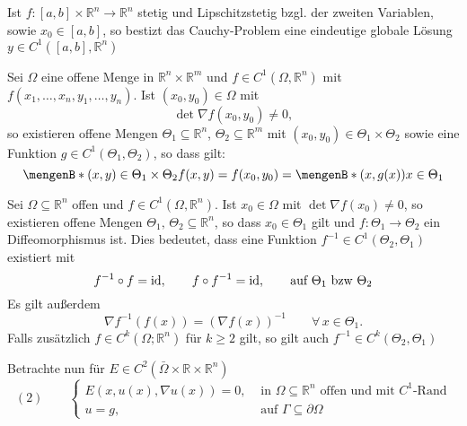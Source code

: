 \begin{bemerkung}
	Ist $f: [a,b] \times \mathbb{R}^n \to \mathbb{R}^n$ stetig und Lipschitzstetig bzgl. der zweiten Variablen, sowie $x_0 \in [a,b]$, so bestizt das Cauchy-Problem
	eine eindeutige globale Lösung $y \in C^1([a,b], \mathbb{R}^n)$
\end{bemerkung}

\begin{satz}
	Sei $\Omega$ eine offene Menge in $\mathbb{R}^n \times \mathbb{R}^m$ und $f \in C^1(\Omega, \mathbb{R}^n)$ mit $f(x_1,\dots,x_n,y_1, \dots, y_n)$. Ist $(x_0,y_0) \in \Omega$ mit 
	\[
		\det  \nabla f(x_0,y_0) \neq 0,
	\] 
	so existieren offene Mengen $\Theta_1 \subseteq \mathbb{R}^n $, $ \Theta_2 \subseteq \mathbb{R}^m$ mit $(x_0,y_0) \in \Theta_1 \times \Theta_2$ sowie eine
	Funktion $g \in C^1(\Theta_1, \Theta_2)$, so dass gilt:
	\[
		\set[(x,y) \in \Theta_1 \times \Theta_2]{f(x,y)=f(x_0,y_0)} = \set[(x,g(x))]{x \in \Theta_1}
	\]
\end{satz}

\begin{satz}
	Sei $\Omega \subseteq \mathbb{R}^n$ offen und $f \in C^1(\Omega,\mathbb{R}^n)$. Ist $x_0 \in \Omega$ mit $\det  \nabla f(x_0) \neq 0$, so existieren offene Mengen
	$\Theta_1, \, \Theta_2 \subseteq  \mathbb{R}^n$, so dass $x_0 \in \Theta_1$ gilt und $f: \Theta_1 \to \Theta_2$ ein Diffeomorphismus ist. Dies bedeutet, dass eine Funktion $f^{-1} \in C^1(\Theta_2, \Theta_1)$ existiert mit 
	\[
		f^{-1} \circ f = \operatorname{id}, \qquad f \circ f^{-1} = \operatorname{id}, \qquad \text{auf } \Theta_1 \text{ bzw } \Theta_2
	\]
	Es gilt außerdem 
	\[
		 \nabla f^{-1}(f(x)) = ( \nabla f(x))^{-1} \qquad \forall\, x \in \Theta_1.
	\]
	Falls zusätzlich $f \in C^k(\Omega; \mathbb{R}^n)$ für $k \geq 2$ gilt, so gilt auch $f ^{-1} \in C^k(\Theta_2,\Theta_1)$
 \end{satz}
Betrachte nun für $E \in C^2( \bar{\Omega} \times \mathbb{R} \times \mathbb{R}^n)$
\[
	(2) \qquad \begin{cases}
		E(x,u(x), \nabla u(x))=0, &\text{ in }\Omega \subseteq \mathbb{R}^n \text{ offen und mit $C^1$-Rand}\\
		u=g,&\text{ auf }\Gamma \subseteq \partial \Omega
	\end{cases}
\]
